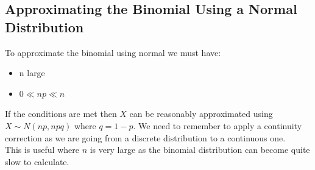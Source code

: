 \documentclass[a4paper,12pt]{article}
\begin{document}
\subsection*{Approximating the Binomial Using a Normal Distribution}
To approximate the binomial using normal we must have:
\begin{itemize}
	\item n large
	\item $0 \ll np \ll n$
\end{itemize}
If the conditions are met then $X$ can be reasonably approximated using  $X \sim N(np, npq)$ where $q = 1-p$. We need to remember to apply a continuity correction as we are going from a discrete distribution to a continuous one. \\

This is useful where $n$ is very large as the binomial distribution can become quite slow to calculate. \\
\end{document}
